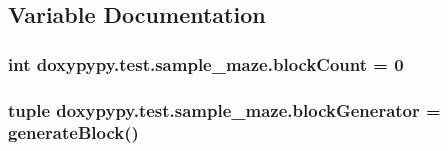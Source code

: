 \subsection{Variable Documentation}
\hypertarget{namespacedoxypypy_1_1test_1_1sample__maze_af5cec1785b747e7565e93e5430026d2d}{
\subsubsection[{block\-Count}]{\setlength{\rightskip}{0pt plus 5cm}int doxypypy.\-test.\-sample\-\_\-maze.\-block\-Count = 0}}\label{namespacedoxypypy_1_1test_1_1sample__maze_af5cec1785b747e7565e93e5430026d2d}
\hypertarget{namespacedoxypypy_1_1test_1_1sample__maze_a3bd5285ec2651e7c4ae17ca0ce63fbe3}{
\subsubsection[{block\-Generator}]{\setlength{\rightskip}{0pt plus 5cm}tuple doxypypy.\-test.\-sample\-\_\-maze.\-block\-Generator = {\bf generate\-Block}()}}\label{namespacedoxypypy_1_1test_1_1sample__maze_a3bd5285ec2651e7c4ae17ca0ce63fbe3}
